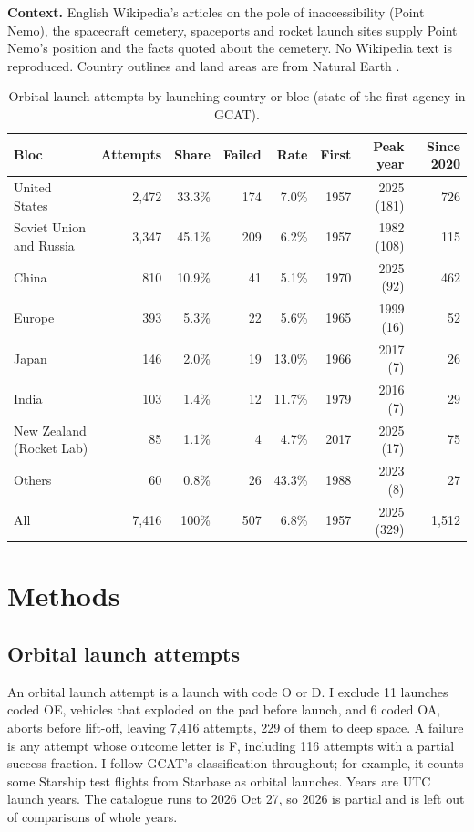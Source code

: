 \documentclass[11pt,a4paper]{article}
\begin{document}
\textbf{Context.} English Wikipedia's articles on the pole of inaccessibility (Point Nemo), the spacecraft cemetery, spaceports and rocket launch sites \citep{wikinemo,wikicem,wikiport,wikilist} supply Point Nemo's position and the facts quoted about the cemetery. No Wikipedia text is reproduced. Country outlines and land areas are from Natural Earth \citep{naturalearth}.

\begin{table}[tbp]\centering\small\caption{Orbital launch attempts by launching country or bloc (state of the first agency in GCAT).}\label{tab:blocs}\begin{tabular}{lrrrrrrr}\toprule Bloc & Attempts & Share & Failed & Rate & First & Peak year & Since 2020\\\midrule
United States & 2,472 & 33.3\% & 174 & 7.0\% & 1957 & 2025 (181) & 726\\
Soviet Union and Russia & 3,347 & 45.1\% & 209 & 6.2\% & 1957 & 1982 (108) & 115\\
China & 810 & 10.9\% & 41 & 5.1\% & 1970 & 2025 (92) & 462\\
Europe & 393 & 5.3\% & 22 & 5.6\% & 1965 & 1999 (16) & 52\\
Japan & 146 & 2.0\% & 19 & 13.0\% & 1966 & 2017 (7) & 26\\
India & 103 & 1.4\% & 12 & 11.7\% & 1979 & 2016 (7) & 29\\
New Zealand (Rocket Lab) & 85 & 1.1\% & 4 & 4.7\% & 2017 & 2025 (17) & 75\\
Others & 60 & 0.8\% & 26 & 43.3\% & 1988 & 2023 (8) & 27\\
\midrule All & 7,416 & 100\% & 507 & 6.8\% & 1957 & 2025 (329) & 1,512\\
\bottomrule\end{tabular}\end{table}

\section{Methods}
\subsection{Orbital launch attempts}
An orbital launch attempt is a launch with code O or D. I exclude 11 launches coded OE, vehicles that exploded on the pad before launch, and 6 coded OA, aborts before lift-off, leaving 7,416 attempts, 229 of them to deep space. A failure is any attempt whose outcome letter is F, including 116 attempts with a partial success fraction. I follow GCAT's classification throughout; for example, it counts some Starship test flights from Starbase as orbital launches. Years are UTC launch years. The catalogue runs to 2026 Oct 27, so 2026 is partial and is left out of comparisons of whole years.
\end{document}
